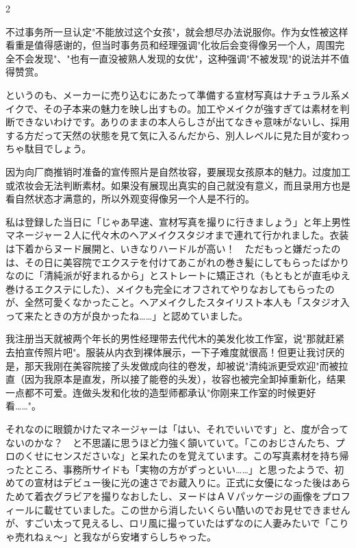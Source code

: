 \documentclass[12pt,UTF8]{ctexbook}
\begin{document}
\begin{paracol}{2}
\switchcolumn

不过事务所一旦认定"不能放过这个女孩"，就会想尽办法说服你。作为女性被这样看重是值得感谢的，但当时事务员和经理强调"化妆后会变得像另一个人，周围完全不会发现"、"也有一直没被熟人发现的女优"，这种强调"不被发现"的说法并不值得赞赏。

\switchcolumn*

というのも、メーカーに売り込むにあたって準備する宣材写真はナチュラル系メイクで、その子本来の魅力を映し出すもの。加工やメイクが強すぎては素材を判断できないわけです。ありのままの本人らしさが出てなきゃ意味がないし、採用する方だって天然の状態を見て気に入るんだから、別人レベルに見た目が変わっちゃ駄目でしょう。

\switchcolumn

因为向厂商推销时准备的宣传照片是自然妆容，要展现女孩原本的魅力。过度加工或浓妆会无法判断素材。如果没有展现出真实的自己就没有意义，而且录用方也是看自然状态才满意的，所以外观变得像另一个人是不行的。

\switchcolumn*

私は登録した当日に「じゃあ早速、宣材写真を撮りに行きましょう」と年上男性マネージャー２人に代々木のヘアメイクスタジオまで連れて行かれました。衣装は下着からヌード展開と、いきなりハードルが高い！　ただもっと嫌だったのは、その日に美容院でエクステを付けてあこがれの巻き髪にしてもらったばかりなのに「清純派が好まれるから」とストレートに矯正され（もともとが直毛ゆえ巻けるエクステにした）、メイクも完全にオフされてやりなおしてもらったのが、全然可愛くなかったこと。ヘアメイクしたスタイリスト本人も「スタジオ入って来たときの方が良かったね……」と認めていました。

\switchcolumn

我注册当天就被两个年长的男性经理带去代代木的美发化妆工作室，说"那就赶紧去拍宣传照片吧"。服装从内衣到裸体展示，一下子难度就很高！但更让我讨厌的是，那天我刚在美容院接了头发做成向往的卷发，却被说"清纯派更受欢迎"而被拉直（因为我原本是直发，所以接了能卷的头发），妆容也被完全卸掉重新化，结果一点都不可爱。连做头发和化妆的造型师都承认"你刚来工作室的时候更好看……"。

\switchcolumn*

それなのに眼鏡かけたマネージャーは「はい、それでいいです」と、度が合ってないのかな？　と不思議に思うほど力強く頷いていて。「このおじさんたち、プロのくせにセンスださいな」と呆れたのを覚えています。この写真素材を持ち帰ったところ、事務所サイドも「実物の方がずっといい……」と思ったようで、初めての宣材はデビュー後に光の速さでお蔵入りに。正式に女優になった後はあらためて着衣グラビアを撮りなおしたし、ヌードはＡＶパッケージの画像をプロフィールに載せていました。この世から消したいくらい酷いのでお見せできませんが、すごい太って見えるし、ロリ風に撮っていたはずなのに人妻みたいで「こりゃ売れねぇ〜」と我ながら安堵すらしちゃった。


\end{paracol}
\end{document}
